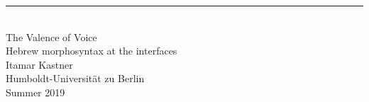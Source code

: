 \singlespacing
\begin{center}
\rule{165pt}{0pt} \\
\vspace{1cm}
\LARGE{The Valence of Voice}\\
\vspace{1cm}
\Large{Hebrew morphosyntax at the interfaces}\\
\vspace{2cm}
\large{Itamar Kastner} \\
\vspace{0.4cm}
\normalsize{Humboldt-Universit\"at zu Berlin} \\
\vspace{1cm}
\normalsize{Summer 2019} %

\end{center}
